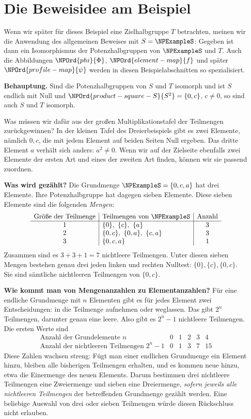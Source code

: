 \section*{Die Beweisidee am Beispiel}

Wenn wir später für dieses Beispiel eine Zielhalbgruppe \(T\) betrachten,
meinen wir die Anwendung des allgemeinen Beweises mit
\(S=\NPExampleS\): Gegeben ist dann ein Isomorphismus der
Potenzhalbgruppen von \(\NPExampleS\) und \(T\).
Auch die Abbildungen \(\NPOrd{phi}{\Phi}\), \(\NPOrd{element-map}{f}\) und später
\(\NPOrd{profile-map}{\psi}\) werden in diesen Beispielabschnitten so spezialisiert.

\noindent\textbf{Behauptung.} Sind die Potenzhalbgruppen von \(S\) und
\(T\) isomorph und ist \(S\) endlich mit Null und \(\NPOrd{product-square-S}{S^2}=\{0,c\}\),
\(c\ne0\), so sind auch \(S\) und \(T\) isomorph.

Was müssen wir dafür aus der großen Multiplikationstafel der Teilmengen
zurückgewinnen? In der kleinen Tafel des Dreierbeispiels gibt es zwei
Elemente, nämlich \(0,c\), die mit jedem Element auf beiden Seiten Null
ergeben. Das dritte Element \(a\) verhält sich anders: \(a^2\ne0\).
Wenn wir auf der Zielseite ebenfalls zwei Elemente der ersten Art und
eines der zweiten Art finden, können wir sie passend zuordnen.

\medskip\noindent\textbf{Was wird gezählt?}
Die Grundmenge \(\NPExampleS=\{0,c,a\}\) hat drei Elemente. Ihre
Potenzhalbgruppe hat dagegen sieben Elemente. Diese sieben Elemente
sind die folgenden \emph{Mengen}:
\[
 \begin{array}{c|l|c}
 \text{Größe der Teilmenge}&\text{Teilmengen von }\NPExampleS&\text{Anzahl}\\\hline
 1&\{0\},\ \{c\},\ \{a\}&3\\
 2&\{0,c\},\ \{0,a\},\ \{c,a\}&3\\
 3&\{0,c,a\}&1
 \end{array}
\]
Zusammen sind es \(3+3+1=7\) nichtleere Teilmengen.
Unter diesen sieben Mengen bestehen genau drei jeden linken und
rechten Nulltest: \(\{0\},\{c\},\{0,c\}\).
Sie sind sämtliche nichtleeren Teilmengen von \(\{0,c\}\).

\medskip\noindent\textbf{Wie kommt man von Mengenanzahlen zu Elementanzahlen?}
Für eine endliche Grundmenge mit \(n\) Elementen gibt es für jedes
Element zwei Entscheidungen: in die Teilmenge aufnehmen oder weglassen.
Das gibt \(2^n\) Teilmengen, darunter genau eine leere.
Also gibt es \(2^n-1\) nichtleere Teilmengen. Die ersten Werte sind
\[
 \begin{array}{c|ccccc}
 \text{Anzahl der Grundelemente }n&0&1&2&3&4\\\hline
 \text{Anzahl der nichtleeren Teilmengen }2^n-1&0&1&3&7&15
 \end{array}
\]
Diese Zahlen wachsen streng: Fügt man einer endlichen Grundmenge ein
Element hinzu, bleiben alle bisherigen Teilmengen erhalten, und es
kommen neue hinzu, etwa die Einermenge des neuen Elements.
Darum bestimmen drei nichtleere Teilmengen eine Zweiermenge und sieben
eine Dreiermenge, \emph{sofern jeweils alle nichtleeren Teilmengen}
der betreffenden Grundmenge gezählt werden.
Eine beliebige Auswahl von drei oder sieben Teilmengen würde diesen
Rückschluss nicht erlauben.

